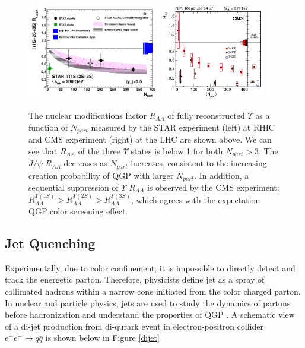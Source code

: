 \begin{figure}[hbtp]
\begin{center}
\includegraphics[width=0.52\textwidth]{Figures/Chapter1/STARUpsilon.png}
\includegraphics[width=0.40\textwidth]{Figures/Chapter1/CMSUpsilon.png}
\caption{The nuclear modifications factor $R_{AA}$ of fully reconstructed $\Upsilon$ as a function of $N_{part}$ measured by the STAR experiment (left) at RHIC and CMS experiment (right) at the LHC are shown above. We can see that $R_{AA}$  of the three $\Upsilon$ states is below 1 for both $N_{part} > 3$. The $J/\psi$ $R_{AA}$ decreases as $N_{part}$ increases, consistent to the increasing creation probability of QGP with larger $N_{part}$. In addition, a sequential suppression of $\Upsilon$ $R_{AA}$ is observed by the CMS experiment: $R_{AA}^{\Upsilon(1S)} > R_{AA}^{\Upsilon(2S)} > R_{AA}^{\Upsilon(3S)}$, which agrees with the expectation QGP color screening effect.}
\label{UpsilonSupp}
\end{center}
\end{figure} 


\subsection{Jet Quenching} 

Experimentally, due to color confinement, it is impossible to directly detect and track the energetic parton. Therefore, physicists define jet as a spray of collimated hadrons within a narrow cone initiated from the color charged parton. In nuclear and particle physics, jets are used to study the dynamics of partons before hadronization \cite{HERAJET} and understand the properties of QGP \cite{}. A schematic view of a di-jet production from di-qurark event in electron-positron collider $e^+e^-\rightarrow q \bar q$ is shown below in Figure \ref{dijet}


